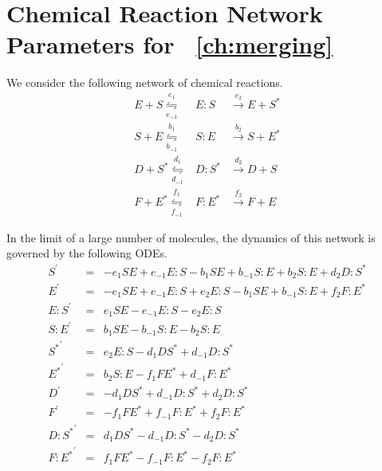 
\chapter{Chemical Reaction Network Parameters for \chap~\ref{ch:merging}}\label{app:merging}

\graphicspath{{ch-merging/figures/}}


We consider the following network of chemical reactions.
\begin{equation}
\begin{array}{rcl}
E + S \overset{e_1}{\underset{e_{-1}}{\leftrightharpoons}} & E:S & \overset{e_2}{\rightarrow} E + S^{*} \\
S + E \overset{b_1}{\underset{b_{-1}}{\leftrightharpoons}} & S:E & \overset{b_2}{\rightarrow} S + E^{*}\\
D + S^{*} \overset{d_1}{\underset{d_{-1}}{\leftrightharpoons}} & D:S^{*} & \overset{d_2}{\rightarrow} D + S\\
F + E^{*} \overset{f_1}{\underset{f_{-1}}{\leftrightharpoons}} & F:E^{*} & \overset{f_2}{\rightarrow} F + E
\end{array}
\end{equation}

In the limit of a large number of molecules, the dynamics of this network is governed by the following ODEs.
\begin{equation}
    \begin{array}{rcl}
        S^\prime & = & -e_1 S E + e_{-1} E:S -b_1 S E + b_{-1} S:E + b_2 S:E + d_2 D:S^{*} \\
        E^\prime & = & -e_1 S E + e_{-1} E:S + e_2 E:S - b_1 S E +b_{-1} S:E + f_2 F:E^{*} \\
        E:S^\prime & = & e_1 S E -e_{-1} E:S -e_2 E:S \\
        S:E^\prime & = & b_1 S E -b_{-1} S:E -b_2 S:E \\
        {S^{*}}^\prime & = & e_2 E:S -d_1 D S^{*} + d_{-1} D:S^{*} \\
        {E^{*}}^\prime & = & b_2 S:E -f_1 F E^{*} + d_{-1} F:E^{*} \\
        D^\prime & = & -d_1 D S^{*} + d_{-1} D:S^{*} + d_2 D:S^{*} \\
        F^\prime & = & -f_1 F E^{*} + f_{-1} F:E^{*} + f_2 F:E^{*} \\
        {D:S^{*}}^\prime & = & d_1 D S^{*} - d_{-1} D:S^{*} -d_2 D:S^{*} \\
        {F:E^{*}}^\prime & = & f_1 FE^{*} - f_{-1} F:E^{*} -f_2 F:E^{*}
    \end{array}
\end{equation}


